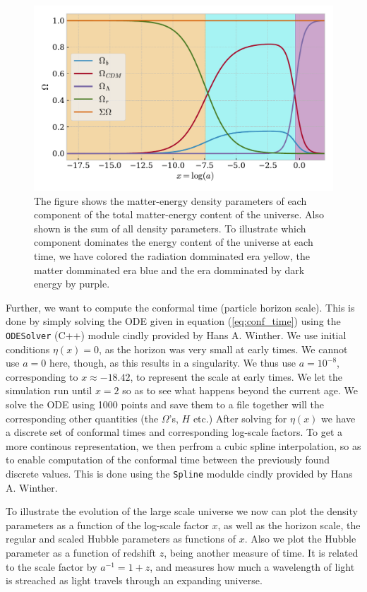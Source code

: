 \documentclass[twocolumn]{aastex62}
\begin{document}
\begin{figure}
    \includegraphics[scale=1]{Figures/Omegas_of_x.pdf}
    \caption{The figure shows the matter-energy density parameters of each component of the total matter-energy content of the universe. Also shown is the sum of all density parameters. To illustrate which component dominates the energy content of the universe at each time, we have colored the radiation domminated era yellow, the matter domminated era blue and the era domminated by dark energy by purple.}
    \label{fig:Omegas}
\end{figure}

Further, we want to compute the conformal time (particle horizon scale). This is
done by simply solving the ODE given in equation (\ref{eq:conf_time}) using the
\texttt{ODESolver} (C++) module cindly provided by Hans A. Winther. We use initial
conditions $\eta(x) = 0$, as the horizon was very small at early times. We
cannot use $a = 0$ here, though, as this results in a singularity. We thus use
$a = 10^{-8}$, corresponding to $x \approx -18.42$, to represent the scale at
early times. We let the simulation run until $x = 2$ so as to see what happens
beyond the current age. We solve the ODE using 1000 points and save them to a
file together will the corresponding other quantities (the $\Omega$'s, $H$ etc.)
After solving for $\eta(x)$ we have a discrete set of conformal times and
corresponding log-scale factors. To get a more continous representation, we then
perfrom a cubic spline interpolation, so as to enable computation of the
conformal time between the previously found discrete values. This is done using
the \texttt{Spline} modulde cindly provided by Hans A. Winther.

To illustrate the evolution of the large scale universe we now can plot the
density parameters as a function of the log-scale factor $x$, as well as the
horizon scale, the regular and scaled Hubble parameters as functions of $x$.
Also we plot the Hubble parameter as a function of redshift $z$, being another
measure of time. It is related to the scale factor by $a^{-1} = 1 + z$, and
measures how much a wavelength of light is streached as light travels through an
expanding universe.
\end{document}
